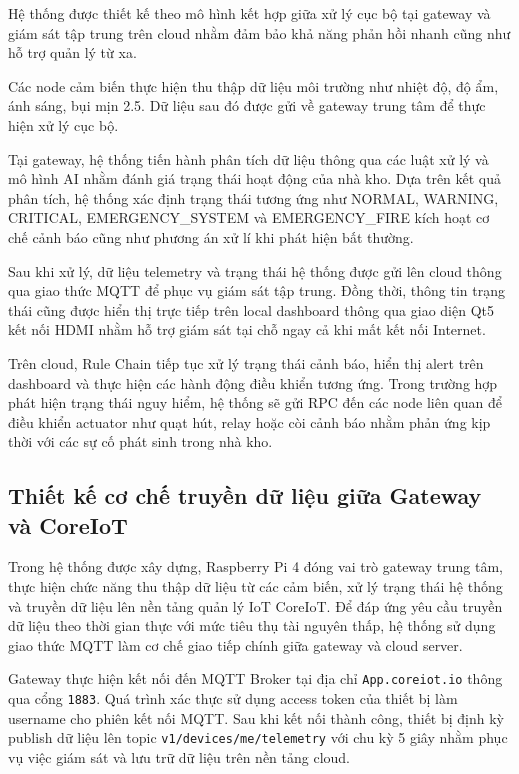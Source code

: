 Hệ thống được thiết kế theo mô hình kết hợp giữa xử lý cục bộ tại gateway và giám sát tập trung trên cloud nhằm đảm bảo khả năng phản hồi nhanh cũng như hỗ trợ quản lý từ xa.

Các node cảm biến thực hiện thu thập dữ liệu môi trường như nhiệt độ, độ ẩm, ánh sáng, bụi mịn 2.5. Dữ liệu sau đó được gửi về gateway trung tâm để thực hiện xử lý cục bộ.

Tại gateway, hệ thống tiến hành phân tích dữ liệu thông qua các luật xử lý và mô hình AI nhằm đánh giá trạng thái hoạt động của nhà kho. Dựa trên kết quả phân tích, hệ thống xác định trạng thái tương ứng như NORMAL, WARNING, CRITICAL, EMERGENCY\_SYSTEM và EMERGENCY\_FIRE kích hoạt cơ chế cảnh báo cũng như phương án xử lí khi phát hiện bất thường.

Sau khi xử lý, dữ liệu telemetry và trạng thái hệ thống được gửi lên cloud thông qua giao thức MQTT để phục vụ giám sát tập trung. Đồng thời, thông tin trạng thái cũng được hiển thị trực tiếp trên local dashboard thông qua giao diện Qt5 kết nối HDMI nhằm hỗ trợ giám sát tại chỗ ngay cả khi mất kết nối Internet.

Trên cloud, Rule Chain tiếp tục xử lý trạng thái cảnh báo, hiển thị alert trên dashboard và thực hiện các hành động điều khiển tương ứng. Trong trường hợp phát hiện trạng thái nguy hiểm, hệ thống sẽ gửi RPC đến các node liên quan để điều khiển actuator như quạt hút, relay hoặc còi cảnh báo nhằm phản ứng kịp thời với các sự cố phát sinh trong nhà kho.


\subsection{Thiết kế cơ chế truyền dữ liệu giữa Gateway và CoreIoT}

Trong hệ thống được xây dựng, Raspberry Pi 4 đóng vai trò gateway trung tâm, thực hiện chức năng thu thập dữ liệu từ các cảm biến, xử lý trạng thái hệ thống và truyền dữ liệu lên nền tảng quản lý IoT CoreIoT. Để đáp ứng yêu cầu truyền dữ liệu theo thời gian thực với mức tiêu thụ tài nguyên thấp, hệ thống sử dụng giao thức MQTT làm cơ chế giao tiếp chính giữa gateway và cloud server.

Gateway thực hiện kết nối đến MQTT Broker tại địa chỉ \texttt{App.\allowbreak coreiot.\allowbreak io} thông qua cổng \texttt{1883}. Quá trình xác thực sử dụng access token của thiết bị làm username cho phiên kết nối MQTT. Sau khi kết nối thành công, thiết bị định kỳ publish dữ liệu lên topic \texttt{v1/\allowbreak devices/\allowbreak me/\allowbreak telemetry} với chu kỳ 5 giây nhằm phục vụ việc giám sát và lưu trữ dữ liệu trên nền tảng cloud.

